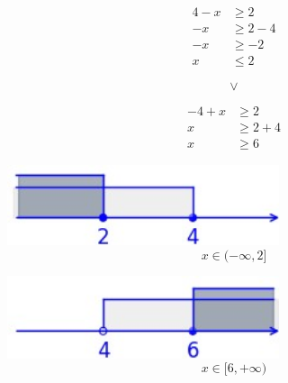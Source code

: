 \documentclass[12pt, a4paper]{report}
\begin{document}
    \noindent
    \begin{center}
    \begin{minipage}{0.2\textwidth}
        \begin{align*}
            4 - x &\geq 2 \\
            -x &\geq 2 - 4 \\
            -x &\geq -2 \\
            x &\leq 2
        \end{align*}
    \end{minipage}
    \hspace{0.05\textwidth}
    \begin{minipage}{0.04\textwidth}
        \[
        \vee
        \]
    \end{minipage}
    \hspace{0.05\textwidth}
    \begin{minipage}{0.2\textwidth}
        \begin{align*}
        -4 + x &\geq 2 \\
        x &\geq 2 + 4 \\
        x &\geq 6
        \end{align*}
    \end{minipage}
    \end{center}


    \begin{center}
        \begin{minipage}{0.3\textwidth}
            \centering
            \includegraphics[width=0.6\textwidth]{fig_2.jpg}
            \[x \in (-\infty, 2]\]
        \end{minipage}
        \hspace{0.01\textwidth}
        \begin{minipage}{0.01\textwidth}
        \end{minipage}
        \hspace{0.1\textwidth}
        \begin{minipage}{0.3\textwidth}
            \centering
            \includegraphics[width=0.6\textwidth]{fig_3.jpg}
            \[x \in [6, +\infty)\]
        \end{minipage}
    \end{center}
\end{document}
